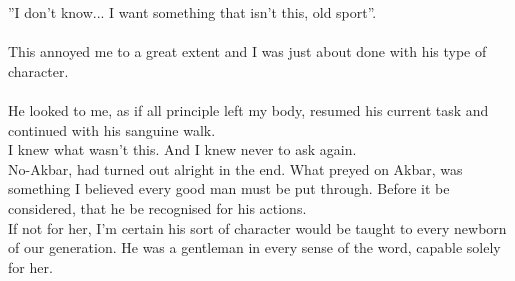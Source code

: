 \documentclass{book}
\begin{document}
{{''I don't know... I want something that isn't this, old sport''.\\\\
This annoyed me to a great extent and I was just about done with his type of character.\\\\
He looked to me, as if all principle left my body, resumed his current task and continued
with his sanguine walk.\\
I knew what wasn't this. And I knew never to ask again.\\
No-Akbar, had turned out alright in the end.
What preyed on Akbar, was something I believed
every good man must be put through.
Before it be considered, that he be recognised for his actions.\\
If not for her, I'm certain his sort of character would be
taught to every newborn of our generation. He
was a gentleman in every sense of the word, capable solely
for her.\\\\
}
}
\begingroup
\let\clearpage\relax
\end{document}
